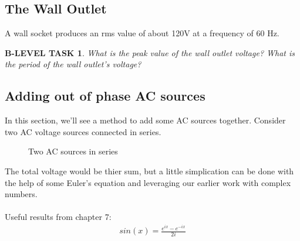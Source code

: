 \documentclass{book}
\numberwithin{equation}{section}
\newtheorem{blevel}{B-LEVEL TASK}
\theoremstyle{definition}
\begin{document}
\subsection{The Wall Outlet}
A wall socket produces an rms value of about 120V at a frequency of 60 Hz. 

\begin{blevel}
What is the peak value of the wall outlet voltage? What is the period of the wall outlet's voltage?
\end{blevel}


\subsection{Adding out of phase AC sources}
In this section, we'll see a method to add some AC sources together. Consider two AC voltage sources connected in series.

\begin{figure}[H]
\begin{center}
\caption{Two AC sources in series}
\end{center}
\end{figure}

The total voltage would be thier sum, but a little simplication can be done with the help of some Euler's equation and leveraging our earlier work with complex numbers.\\
\\
Useful results from chapter 7:
\begin{align}
sin(x)=\frac{e^{ix}-e^{-ix}}{2i} \label{E:8SIN}
\end{align}
\end{document}
